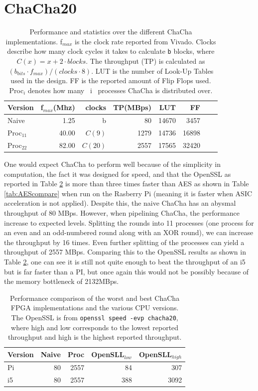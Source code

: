 \documentclass[a4paper, openany]{book}
\begin{document}
\section{ChaCha20}
\label{sec:orgeddb02f}
\begin{table}[!htb]
\centering
\captionsetup{width=.8\linewidth}
\begin{tabular}{l r r r r r r r}
\hline
Version & f$_{max}$(Mhz) & clocks & TP(MBps) & LUT & FF\\
\hline
Naive  & 1.25 & b & 80           & 14670 & 3457\\
Proc$_{11}$ & 40.00 & $C(9)$ & 1279 &  14736 & 16898\\
Proc$_{22}$ & 82.00 & $C(20)$ & 2557 & 17565 & 32420\\
\end{tabular}
\caption[ChaCha20: FPGA Versions]%
{Performance and statistics over the different ChaCha implementations. f$_{max}$ is the clock rate reported from Vivado. Clocks describe how many clock cycles it takes to calculate \texttt{b} blocks, where $C(x) = x+2 \cdot blocks$. The throughput (TP) is calculated as \((b_{bits}\cdot f_{max})/(clocks \cdot 8)\). LUT is the number of Look-Up Tables used in the design. FF is the reported amount of Flip Flops used. Proc$_{i}$ denotes how many ~i~ processes ChaCha is distributed over.}
\label{tab:ChaChaversions}
\end{table}
One would expect ChaCha to perform well because of the simplicity in computation, the fact it was designed for speed, and that the OpenSSL as reported in Table \ref{tab:ChaChacompare} is more than three times faster than AES as shown in Table \ref{tab:AEScompare} when run on the Rasberry Pi (meaning it is faster when ASIC acceleration is not applied). Despite this, the naive ChaCha has an abysmal throughput of 80 MBps. However, when pipelining ChaCha, the performance increase to expected levels. Splitting the rounds into 11 processes (one process for an even and an odd-numbered round along with an XOR round), we can increase the throughput by 16 times. Even further splitting of the processes can yield a throughput of 2557 MBps. Comparing this to the OpenSSL results as shown in Table \ref{tab:ChaChacompare}, one can see it is still not quite enough to beat the throughput of an i5 but is far faster than a PI, but once again this would not be possibly because of the memory bottleneck of 2132MBps.

\begin{table}[!htb]
\centering
\captionsetup{width=.8\linewidth}
\begin{tabular}{l r r r r}
\hline
\textbf{Version} & Naive & Proc & OpenSLL$_{low}$ & OpenSLL$_{high}$\\
\hline
Pi & 80 & 2557 & 84 & 307\\
i5 &  80  &  2557    & 388   & 3092
\end{tabular}
\caption[ChaCha20: FPGA and CPU comparisons]%
{Performance comparison of the worst and best ChaCha FPGA implementations and the various CPU versions. The OpenSSL is from \texttt{openssl speed -evp chacha20}, where high and low corresponds to the lowest reported throughput and high is the highest reported throughput.}
\label{tab:ChaChacompare}
\end{table}
\end{document}
